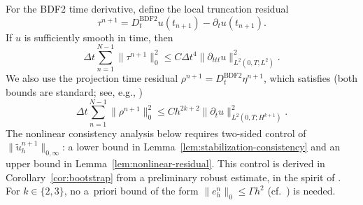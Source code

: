 \documentclass[11pt]{article}
\theoremstyle{remark}\newtheorem{remark}{Remark}
\newcommand{\Dt}{D_t^{\mathrm{BDF2}}}
\newcommand{\tu}{\tilde u_h}
\theoremstyle{plain}
\newcommand{\new}[1]{{\color{blue}#1}}
\begin{document}
For the BDF2 time derivative, define the local truncation residual
\[\tau^{n+1}=\Dt u(t_{n+1})-\partial_tu(t_{n+1}).\]
If $u$ is sufficiently smooth in time, then
\[\Delta t\sum_{n=1}^{N-1}\|\tau^{n+1}\|_0^2\le C\Delta t^4\|\partial_{ttt}u\|_{L^2(0,T;L^2)}^2.\]
We also use the projection time residual $\rho^{n+1}=\Dt\eta^{n+1}$, which satisfies \new{(both bounds are standard; see, e.g., \cite{GAN23})}
\[\Delta t\sum_{n=1}^{N-1}\|\rho^{n+1}\|_0^2\le Ch^{2k+2}\|\partial_tu\|_{L^2(0,T;H^{k+1})}^2.\]
\new{The nonlinear consistency analysis below requires two-sided control of $\|\tu^{n+1}\|_{0,\infty}$: a lower bound in Lemma~\ref{lem:stabilization-consistency} and an upper bound in Lemma~\ref{lem:nonlinear-residual}. This control is derived in Corollary~\ref{cor:bootstrap} from a preliminary robust estimate, in the spirit of \cite[Prop.~3.3]{GAN25}. For $k\in\{2,3\}$, no a~priori bound of the form $\|e_h^n\|_0\le\Gamma h^2$ (cf.\ \cite[Lemma~3.6]{GAN25}) is needed.}
\end{document}
